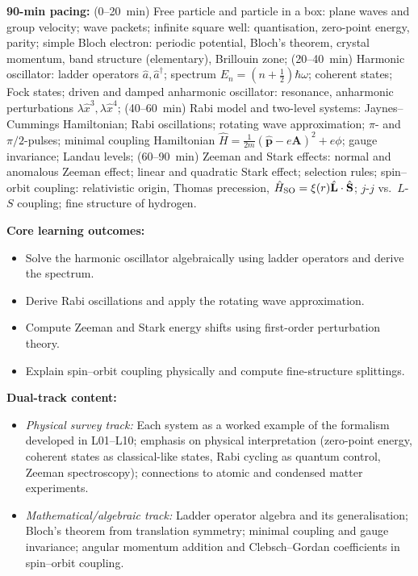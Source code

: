 \documentclass[11pt,a4paper]{article}
\begin{document}
\medskip
\begin{tcolorbox}[modulebox, title={Module~I.3 --- Lecture L11: Example Systems and Physical Effects}]
\textbf{90-min pacing:} (0--20~min) Free particle and particle in a box:
plane waves and group velocity; wave packets; infinite square well: quantisation,
zero-point energy, parity; simple Bloch electron: periodic potential, Bloch's theorem,
crystal momentum, band structure (elementary), Brillouin zone;
(20--40~min) Harmonic oscillator: ladder operators $\hat{a},\hat{a}^\dagger$;
spectrum $E_n=(n+\tfrac{1}{2})\hbar\omega$; coherent states; Fock states;
driven and damped anharmonic oscillator: resonance, anharmonic perturbations
$\lambda\hat{x}^3,\lambda\hat{x}^4$;
(40--60~min) Rabi model and two-level systems:
Jaynes--Cummings Hamiltonian; Rabi oscillations; rotating wave approximation;
$\pi$- and $\pi/2$-pulses; minimal coupling Hamiltonian
$\hat{H}=\tfrac{1}{2m}(\hat{\mathbf{p}}-e\mathbf{A})^2+e\phi$;
gauge invariance; Landau levels;
(60--90~min) Zeeman and Stark effects: normal and anomalous Zeeman effect;
linear and quadratic Stark effect; selection rules;
spin--orbit coupling: relativistic origin, Thomas precession,
$\hat{H}_{\rm SO}=\xi(r)\hat{\mathbf{L}}\cdot\hat{\mathbf{S}}$;
$j$-$j$ vs.\ $L$-$S$ coupling; fine structure of hydrogen.

\medskip\textbf{Core learning outcomes:}
\begin{itemize}[leftmargin=1.4em,topsep=2pt,itemsep=1pt]
  \item Solve the harmonic oscillator algebraically using ladder operators and derive the spectrum.
  \item Derive Rabi oscillations and apply the rotating wave approximation.
  \item Compute Zeeman and Stark energy shifts using first-order perturbation theory.
  \item Explain spin--orbit coupling physically and compute fine-structure splittings.
\end{itemize}

\medskip\textbf{Dual-track content:}
\begin{itemize}[leftmargin=1.4em,topsep=2pt,itemsep=1pt]
  \item \textit{Physical survey track:} Each system as a worked example of the formalism
    developed in L01--L10; emphasis on physical interpretation (zero-point energy, coherent
    states as classical-like states, Rabi cycling as quantum control, Zeeman spectroscopy);
    connections to atomic and condensed matter experiments.
  \item \textit{Mathematical/algebraic track:} Ladder operator algebra and its generalisation;
    Bloch's theorem from translation symmetry; minimal coupling and gauge invariance;
    angular momentum addition and Clebsch--Gordan coefficients in spin--orbit coupling.
\end{itemize}


\end{tcolorbox}
\end{document}
